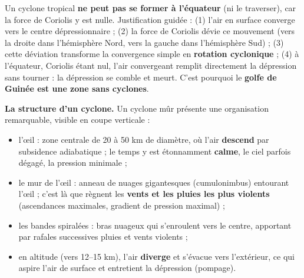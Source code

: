 \documentclass[11pt]{article}
\newcommand{\cle}[1]{{\popxbold\color{popdark}#1}}
\begin{document}
\begin{propriete}
Un cyclone tropical \textbf{ne peut pas se former à l'équateur} (ni le traverser), car la force de Coriolis y est nulle. Justification guidée : (1) l'air en surface converge vers le centre dépressionnaire ; (2) la force de Coriolis dévie ce mouvement (vers la droite dans l'hémisphère Nord, vers la gauche dans l'hémisphère Sud) ; (3) cette déviation transforme la convergence simple en \textbf{rotation cyclonique} ; (4) à l'équateur, Coriolis étant nul, l'air convergeant remplit directement la dépression sans tourner : la dépression se comble et meurt. C'est pourquoi le \textbf{golfe de Guinée est une zone sans cyclones}.
\end{propriete}

\textbf{La structure d'un cyclone.} Un cyclone mûr présente une organisation remarquable, visible en coupe verticale :

\begin{itemize}
\item l'\cle{œil} : zone centrale de 20 à 50 km de diamètre, où l'air \textbf{descend} par subsidence adiabatique ; le temps y est étonnamment \textbf{calme}, le ciel parfois dégagé, la pression minimale ;
\item le \cle{mur de l'œil} : anneau de nuages gigantesques (cumulonimbus) entourant l'œil ; c'est là que règnent les \textbf{vents et les pluies les plus violents} (ascendances maximales, gradient de pression maximal) ;
\item les \cle{bandes spiralées} : bras nuageux qui s'enroulent vers le centre, apportant par rafales successives pluies et vents violents ;
\item en altitude (vers 12--15 km), l'air \textbf{diverge} et s'évacue vers l'extérieur, ce qui aspire l'air de surface et entretient la dépression (pompage).
\end{itemize}
\end{document}
